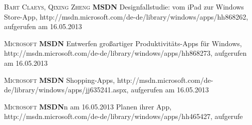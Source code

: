 \begin{thebibliography}{---}
           \textsc{Bart Claeys, Qixing Zheng}
          \textbf{MSDN}
          Designfallstudie: vom iPad zur Windows Store-App, http://msdn.microsoft.com/de-de/library/windows/apps/hh868262, aufgerufen am 16.05.2013
          
            \textsc{Microsoft}
           \textbf{MSDN}
           Entwerfen großartiger Produktivitäts-Apps für Windows, http://msdn.microsoft.com/de-de/library/windows/apps/hh868273, aufgerufen am 16.05.2013
           
              \textsc{Microsoft}
             \textbf{MSDN}
             Shopping-Apps, http://msdn.microsoft.com/de-de/library/windows/apps/jj635241.aspx, aufgerufen am 16.05.2013
             
                \textsc{Microsoft}
               \textbf{MSDN}n am 16.05.2013
 Planen ihrer App, http://msdn.microsoft.com/de-de/library/windows/apps/hh465427, aufgerufe

 
\end{thebibliography}

